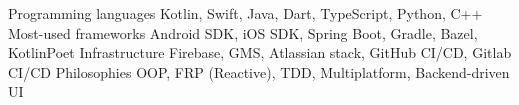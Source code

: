 
\begin{cvskills}
    \cvskill
        {Programming languages}
        {Kotlin, Swift, Java, Dart, TypeScript, Python, C++}
    \cvskill
        {Most-used frameworks} 
        {Android SDK, iOS SDK, Spring Boot, Gradle, Bazel, KotlinPoet}
    \cvskill
        {Infrastructure}
        {Firebase, GMS, Atlassian stack, GitHub CI/CD, Gitlab CI/CD}
    \cvskill
        {Philosophies}
        {OOP, FRP (Reactive), TDD, Multiplatform, Backend-driven UI}
\end{cvskills}
